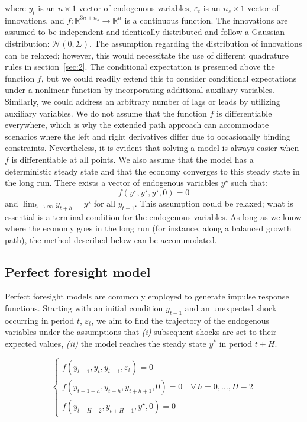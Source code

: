 \documentclass[a4paper,11pt]{amsart}
\begin{document}
where \( y_t \) is an \( n \times 1 \) vector of endogenous
variables, \( \varepsilon_t \) is an \( n_s \times 1 \) vector of
innovations, and \( f: \mathbb R^{3n+n_s} \rightarrow \mathbb R^n \)
is a continuous function. The innovations are assumed to be
independent and identically distributed and follow a Gaussian
distribution: \( \mathcal N(0,\Sigma) \). The assumption regarding the
distribution of innovations can be relaxed; however, this would
necessitate the use of different quadrature rules in section~\ref{sec:2}. The conditional expectation is presented above the
function $f$, but we could readily extend this to consider conditional
expectations under a nonlinear function by incorporating additional
auxiliary variables. Similarly, we could address an arbitrary number
of lags or leads by utilizing auxiliary variables. We do not assume
that the function \(f\) is differentiable everywhere, which is why the
extended path approach can accommodate scenarios where the left and
right derivatives differ due to occasionally binding
constraints. Nevertheless, it is evident that solving a model is
always easier when \(f\) is differentiable at all points. We also
assume that the model has a deterministic steady state and that the
economy converges to this steady state in the long run. There exists a
vector of endogenous variables \(y^{\star}\) such that:
\[
   f\left(y^{\star},y^{\star},y^{\star}, 0\right) = 0
\]
and $\lim_{h\rightarrow\infty}y_{t+h} = y^{\star}$ for all $y_{t-1}$.
This assumption could be relaxed; what is essential is a terminal
condition for the endogenous variables. As long as we know where the
economy goes in the long run (for instance, along a balanced growth
path), the method described below can be accommodated.

\subsection{Perfect foresight model}\label{sec:pf}

Perfect foresight models are commonly employed to generate impulse
response functions. Starting with an initial condition \(y_{t-1}\) and
an unexpected shock occurring in period \(t\), \(\varepsilon_t\), we
aim to find the trajectory of the endogenous variables under the
assumptions that \emph{(i)} subsequent shocks are set to their
expected values, \emph{(ii)} the model reaches the steady
state \(y^*\) in period \(t+H\).

\begin{equation}\label{eq:pf}
   \begin{cases}
      f\left(y_{t-1},y_t,y_{t+1},\varepsilon_t\right) = 0                            \\
      f\left(y_{t-1+h}, y_{t+h}, y_{t+h+1}, 0\right) =0 \quad\forall\, h=0,\dots,H-2 \\
      f\left(y_{t+H-2}, y_{t+H-1}, y^{\star}, 0\right) =0
   \end{cases}
\end{equation}
\end{document}
